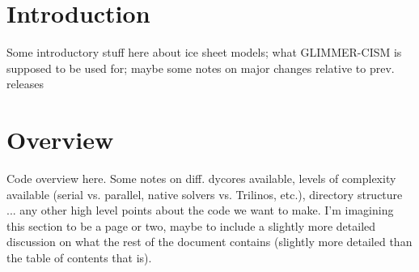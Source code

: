 
\section{Introduction}

Some introductory stuff here about ice sheet models; what GLIMMER-CISM is supposed to be used for; maybe some notes on major changes relative to prev. releases

\section{Overview}

Code overview here. Some notes on diff. dycores available, levels of complexity available (serial vs. parallel, native solvers vs. Trilinos, etc.), directory structure ... any other high level points about the code we want to make. I'm imagining this section to be a page or two, maybe to include a slightly more detailed discussion on what the rest of the document contains (slightly more detailed than the table of contents that is).


